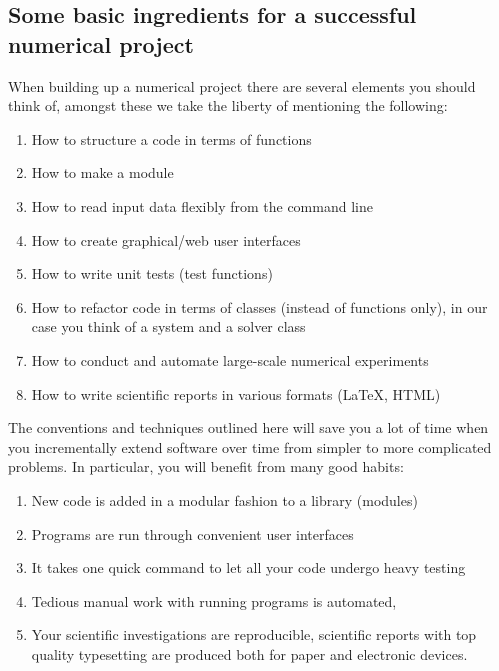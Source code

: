 \documentclass[%
twoside,                 %
final,                   %
10pt]{article}
\begin{document}
\subsection*{Some basic ingredients for a successful numerical project}

When building up a numerical project there are several elements you should think of, amongst these we take the liberty of mentioning the following:
\begin{enumerate}
  \item How to structure a code in terms of functions

  \item How to make a module

  \item How to read input data flexibly from the command line

  \item How to create graphical/web user interfaces

  \item How to write unit tests (test functions)

  \item How to refactor code in terms of classes (instead of functions only), in our case you think of a system and a solver class

  \item How to conduct and automate large-scale numerical experiments

  \item How to write scientific reports in various formats ({\LaTeX}, HTML)
\end{enumerate}

\noindent
The conventions and techniques outlined here will save you a lot of time when you incrementally extend software over time from simpler to more complicated problems. In particular, you will benefit from many good habits:
\begin{enumerate}
\item New code is added in a modular fashion to a library (modules)

\item Programs are run through convenient user interfaces

\item It takes one quick command to let all your code undergo heavy testing 

\item Tedious manual work with running programs is automated,

\item Your scientific investigations are reproducible, scientific reports with top quality typesetting are produced both for paper and electronic devices.
\end{enumerate}
\end{document}
